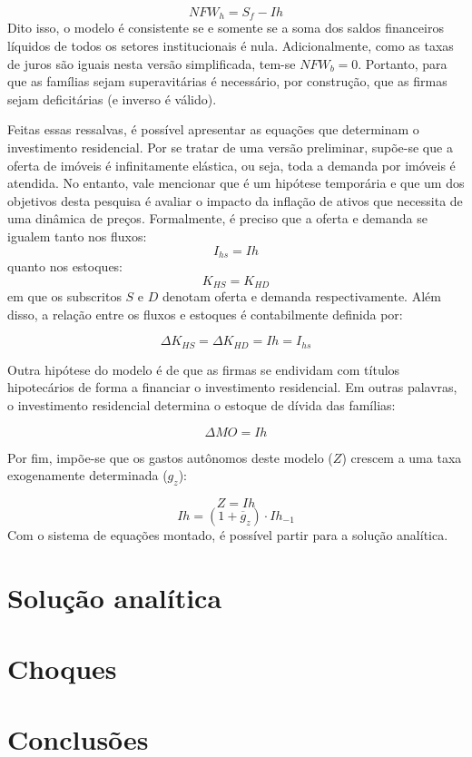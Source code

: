 \begin{equation}
\label{NFWh}
    NFW_h = S_f - Ih
\end{equation}
Dito isso, o modelo é consistente se e somente se a soma dos saldos financeiros líquidos de todos os setores institucionais é nula. Adicionalmente, como as taxas de juros são iguais nesta versão simplificada, tem-se $NFW_b = 0$. Portanto, para que as famílias sejam superavitárias é necessário, por construção, que as firmas sejam deficitárias (e inverso é válido).

Feitas essas ressalvas, é possível apresentar as equações que determinam o investimento residencial. Por se tratar de uma versão preliminar, supõe-se que a oferta de imóveis é infinitamente elástica, ou seja, toda a demanda por imóveis é atendida. No entanto, vale mencionar que é um hipótese temporária e que um dos objetivos desta pesquisa é avaliar o impacto da inflação de ativos que necessita de uma dinâmica de preços. Formalmente, é preciso que a oferta e demanda se igualem tanto nos fluxos:
\begin{equation}
    I_{hs} = Ih
\end{equation}
quanto nos estoques:
\begin{equation}
    K_{HS} = K_{HD}
\end{equation}
em que os subscritos $S$ e $D$ denotam oferta e demanda respectivamente. Além disso, a relação entre os fluxos e estoques é contabilmente definida por:

\begin{equation}
    \Delta K_{HS} = \Delta K_{HD} = Ih = I_{hs}
\end{equation}

Outra hipótese do modelo é de que as firmas se endividam com títulos hipotecários de forma a financiar o investimento residencial. Em outras palavras, o investimento residencial determina o estoque de dívida das famílias:

\begin{equation}
    \label{EqMO}
    \Delta MO = Ih
\end{equation}

Por fim, impõe-se que os gastos autônomos deste modelo ($Z$) crescem a uma taxa exogenamente determinada ($g_z$):

\begin{equation}
    Z = Ih
\end{equation}
\begin{equation}
    Ih = (1 + \overline g_z)\cdot Ih_{-1}
\end{equation}
Com o sistema de equações montado, é possível partir para a solução analítica.

\section{Solução analítica}


\section{Choques}

\section{Conclusões}